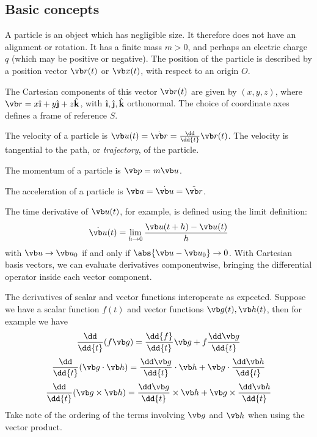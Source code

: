 \subsection{Basic concepts}
\begin{definition}
	A particle is an object which has negligible size.
	It therefore does not have an alignment or rotation.
	It has a finite mass \(m > 0\), and perhaps an electric charge \(q\) (which may be positive or negative).
	The position of the particle is described by a position vector \(\vb r(t)\) or \(\vb x(t)\), with respect to an origin \(O\).
\end{definition}
\begin{definition}
	The Cartesian components of this vector \(\vb r(t)\) are given by \((x, y, z)\), where \(\vb r = x \hat{\textbf{\i}} + y \hat{\textbf{\j}} + z \hat{\textbf{k}}\), with \(\hat{\textbf{\i}}, \hat{\textbf{\j}}, \hat{\textbf{k}}\) orthonormal.
	The choice of coordinate axes defines a frame of reference \(S\).
\end{definition}
\begin{definition}
	The velocity of a particle is \(\vb u(t) = \dot{\vb r} = \frac{\dd}{\dd{t}}\vb r(t)\).
	The velocity is tangential to the path, or \textit{trajectory}, of the particle.
\end{definition}
\begin{definition}
	The momentum of a particle is \(\vb p = m \vb u\).
\end{definition}
\begin{definition}
	The acceleration of a particle is \(\vb a = \dot{\vb u} = \ddot{\vb r}\).
\end{definition}
\begin{note}
	The time derivative of \(\vb u(t)\), for example, is defined using the limit definition:
	\[
		\dot{\vb u}(t) = \lim_{h \to 0} \frac{\vb u(t + h) - \vb u(t)}{h}
	\]
	with \(\vb u \to \vb u_0\) if and only if \(\abs{\vb u - \vb u_0} \to 0\).
	With Cartesian basis vectors, we can evaluate derivatives componentwise, bringing the differential operator inside each vector component.
\end{note}
The derivatives of scalar and vector functions interoperate as expected.
Suppose we have a scalar function \(f(t)\) and vector functions \(\vb g(t), \vb h(t)\), then for example we have
\[
	\frac{\dd}{\dd{t}}(f \vb g) = \frac{\dd{f}}{\dd{t}} \vb g + f \frac{\dd \vb g}{\dd{t}}
\]
\[
	\frac{\dd}{\dd{t}}(\vb g \cdot \vb h) = \frac{\dd \vb g}{\dd{t}}\cdot \vb h + \vb g \cdot \frac{\dd \vb h}{\dd{t}}
\]
\[
	\frac{\dd}{\dd{t}}(\vb g \times \vb h) = \frac{\dd \vb g}{\dd{t}}\times \vb h + \vb g \times \frac{\dd \vb h}{\dd{t}}
\]
Take note of the ordering of the terms involving \(\vb g\) and \(\vb h\) when using the vector product.


